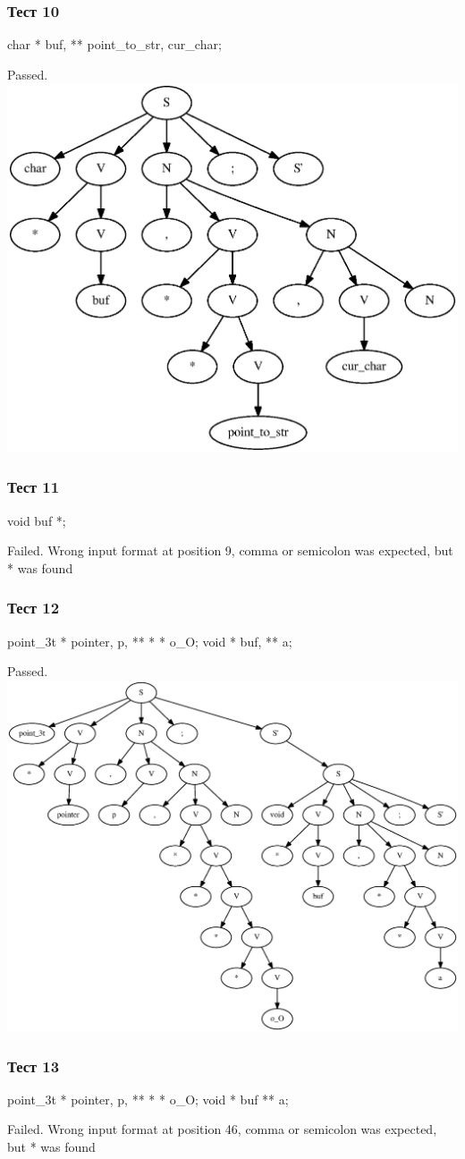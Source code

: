 \subsubsection{Тест 10}
char * buf, ** point\_to\_str, cur\_char;

Passed.
\includegraphics[width=\textwidth]{graph10.eps}

\subsubsection{Тест 11}
void buf *;

Failed.
Wrong input format at position 9, comma or semicolon was expected, but * was found

\subsubsection{Тест 12}
point\_3t * pointer, p, ** * * o\_O; void * buf, ** a;

Passed.
\includegraphics[width=\textwidth]{graph12.eps}

\subsubsection{Тест 13}
point\_3t * pointer, p, ** * * o\_O; void * buf ** a;

Failed.
Wrong input format at position 46, comma or semicolon was expected, but * was found

